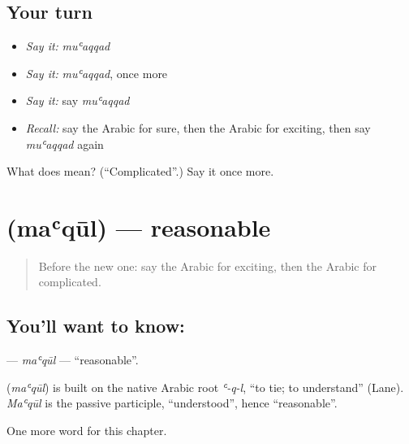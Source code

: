 \subsection*{Your turn}
\begin{itemize}
\raggedright
  \item \emph{Say it:} \emph{muʿaqqad}
  \item \emph{Say it:} \emph{muʿaqqad}, once more
  \item \emph{Say it:} say \emph{muʿaqqad}
  \item \emph{Recall:} say the Arabic for sure, then the Arabic for exciting, then say \emph{muʿaqqad} again
\end{itemize}

\begin{tcolorbox}[breakable,colback=teal!4,colframe=teal!35!black,title={Before you move on}]
What does  mean? (\textquotedblleft{}Complicated\textquotedblright{}.) Say it once more.
\end{tcolorbox}
\section[\texorpdfstring{\ar{معقول} (maʿqūl)}{معقول (maʿqūl)}]{ (maʿqūl) — reasonable}

\label{lesson:AR-C272-maqul}



\begin{quote}
Before the new one: say the Arabic for exciting, then the Arabic for complicated.
\end{quote}

\subsection*{You'll want to know: }
\textbf{} — \emph{maʿqūl} — \textquotedblleft{}reasonable\textquotedblright{}.

\begin{cousinweb}
\textbf{} (\emph{maʿqūl}) is built on the native Arabic root \emph{ʿ-q-l}, \textquotedblleft{}to tie; to understand\textquotedblright{} (Lane). \emph{Maʿqūl} is the passive participle, \textquotedblleft{}understood\textquotedblright{}, hence \textquotedblleft{}reasonable\textquotedblright{}.
\end{cousinweb}

\begin{grammarlens}[title={What you've built}]
One more word for this chapter.
\end{grammarlens}

